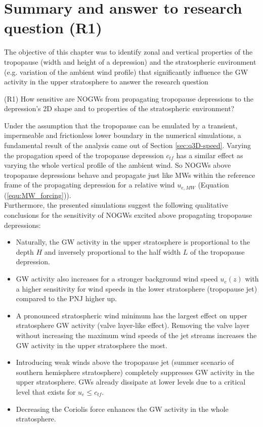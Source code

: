 \section{Summary and answer to research question (R1)}
\label{sec:q3D-summary}
The objective of this chapter was to identify zonal and vertical properties of the tropopause (width and height of a depression) and the stratospheric environment (e.g. variation of the ambient wind profile) that significantly influence the GW activity in the upper stratosphere to answer the research question
\begin{tcolorbox}[]
    (R1) How sensitive are NOGWs from propagating tropopause depressions to the depression's 2D shape and to properties of the stratospheric environment?
\end{tcolorbox}
Under the assumption that the tropopause can be emulated by a transient, impermeable and frictionless lower boundary in the numerical simulations, a fundamental result of the analysis came out of Section \ref{sec:q3D-speed}. Varying the propagation speed of the tropopause depression $c_{tf}$ has a similar effect as varying the whole vertical profile of the ambient wind. So NOGWs above tropopause depressions behave and propagate just like MWs within the reference frame of the propagating depression for a relative wind $u_{e,MW}$ (Equation (\ref{equ:MW_forcing})). \\
Furthermore, the presented simulations suggest the following qualitative conclusions for the sensitivity of NOGWs excited above propagating tropopause depressions:
\begin{itemize}
    \item Naturally, the GW activity in the upper stratosphere is proportional to the depth $H$ and inversely proportional to the half width $L$ of the tropopause depression.
    \item GW activity also increases for a stronger background wind speed $u_e(z)$ with a higher sensitivity for wind speeds in the lower stratosphere (tropopause jet) compared to the PNJ higher up.
    \item A pronounced stratospheric wind minimum has the largest effect on upper stratosphere GW activity (valve layer-like effect). Removing the valve layer without increasing the maximum wind speeds of the jet streams increases the GW activity in the upper stratosphere the most. 
    \item Introducing weak winds above the tropopause jet (summer scenario of southern hemisphere stratosphere) completely suppresses GW activity in the upper stratosphere. GWs already dissipate at lower levels due to a critical level that exists for $u_e \leq c_{tf}$.
    \item Decreasing the Coriolis force enhances the GW activity in the whole stratosphere.
\end{itemize}
